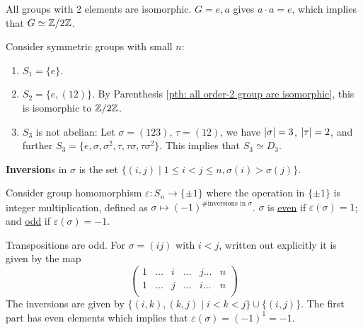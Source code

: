 \documentclass{article}
\begin{document}
\begin{parenthesis} \label{pth: all order-2 group are isomorphic}
    All groups with 2 elements are isomorphic. $G = {e, a}$ gives $a \cdot a = e$, which implies that $G \simeq \mathbb{Z}/2\mathbb{Z}$.
\end{parenthesis}

\begin{example}
    Consider symmetric groups with small $n$: 
    \begin{enumerate}
        \item $S_1 = \{e\}$. 
        \item $S_2 = \{e, (1 2)\}$. By Parenthesis \ref{pth: all order-2 group are isomorphic}, this is isomorphic to $\mathbb{Z}/2\mathbb{Z}$.
        \item $S_3$ is not abelian: Let $\sigma = (1 2 3)$, $\tau = (1 2)$, we have $\left|\sigma\right| = 3$, $\left|\tau\right| = 2$, and further $S_3 = \{e, \sigma, \sigma^2, \tau, \tau\sigma, \tau\sigma^2\}$. This implies that $S_3 \simeq D_3$.
    \end{enumerate}
\end{example}

\begin{definition}[Inversion]
    \textbf{Inversion}s in $\sigma$ is the set $\{ (i, j) \mid 1 \leq i < j \leq n , \sigma(i) > \sigma(j)\}$.
\end{definition}

\begin{definition}[Signature]
    Consider group homomorphism $\varepsilon: S_n \to \{ \pm 1 \}$ where the operation in $\{ \pm 1 \}$ is integer multiplication, defined as $\sigma \mapsto (-1)^{\text{\# inversions in $\sigma$}}$. $\sigma$ is \underline{even} if $\varepsilon(\sigma) = 1$; and \underline{odd} if $\varepsilon(\sigma) = -1$. 
\end{definition}

\begin{example}
    Transpositions are odd. For $\sigma = (i j)$ with $i < j$, written out explicitly it is given by the map
    \[
        \begin{pmatrix}
            1 & \dots & i & \dots & j \dots & n \\
            1 & \dots & j & \dots & i \dots & n \\
        \end{pmatrix}
    \]
    The inversions are given by $\{ (i, k), (k, j) \mid i < k < j \} \cup \{ (i, j) \}$. The first part has even elements which implies that $\varepsilon(\sigma) = (-1)^1 = -1$. 
\end{example}
\end{document}
